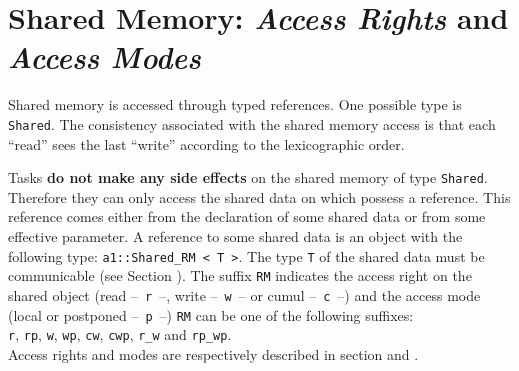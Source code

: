 %




\newpage
\section{Shared Memory: \textit{Access Rights} and \textit{Access Modes}}\label{sec:shared}

Shared memory is accessed through typed references. One possible type is
\verb!Shared!. The consistency associated with the shared memory access is
that each ``read'' sees the last ``write'' according to the lexicographic order.

Tasks \textbf{do not make any side effects}
on the shared memory of type \verb!Shared!.  Therefore they can only access the shared data on which possess a
reference. This reference comes either from the declaration of some
 shared data or
from some effective parameter. A reference to some shared data is
an object with the following type:
 \verb!a1::Shared_RM < T >!.
 The type \verb!T! of the shared data must be communicable (see Section
). The suffix \verb!RM! indicates the access right
on
the shared object (read --~\verb+r+~--,  write --~\verb+w+~-- or
cumul --~\verb+c+~--) and the access mode (local  or postponed
--~\verb+p+~--)
\verb+RM+ can be one of the following suffixes:  \\
{ \verb!r!,
\verb!rp!,
\verb!w!,
\verb!wp!,
\verb!cw!,
\verb!cwp!,
\verb!r_w! and
\verb!rp_wp!.} \\
Access rights and modes are respectively described in section
 and .


